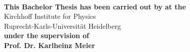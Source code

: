 \begin{titlepage}

\begin{center}
\vspace*{2cm}
\huge{\textbf{\thesisTitle}}\\
\end{center}
\vspace*{10cm}
\large
\begin{center}
{\bf This Bachelor Thesis has been carried out by \thesisAuthor{} at the} \\
\vspace*{0.2cm}
{\sc Kirchhoff Institute for Physics\\

\vspace*{0.2cm}
Ruprecht-Karls-Universität Heidelberg\\}
\vspace*{0.2cm}
{\bf under the supervision of}\\
\vspace*{0.2cm}
{\bf Prof. Dr. Karlheinz Meier}\\
\end{center}

\clearpage

\vspace*{15cm}
\begin{center}
\end{center}


\end{titlepage}

